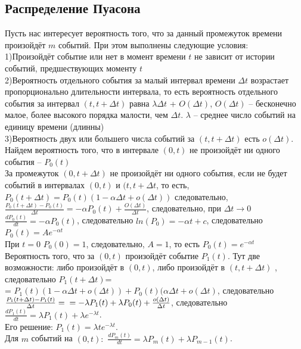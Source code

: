 \documentclass[russian, 12pt, fleqn]{article}
\begin{document}
\subsection{Распределение Пуасона}
\noindent
Пусть нас интересует вероятность того, что за данный промежуток времени произойдёт $m$ событий. При этом выполнены следующие условия:\\
1)Произойдёт событие или нет в момент времени $t$ не зависит от истории событий, предшествующих моменту $t$\\
2)Вероятность отдельного события за малый интервал времени $\Delta t$ возрастает пропорционально длительности интервала, то есть вероятность отдельного события за интервал $(t, t + \Delta t)$ равна $\lambda \Delta t$ + $O(\Delta t)$, $O(\Delta t)$ -- бесконечно малое, более высокого порядка малости, чем $\Delta t$. $\lambda$  -- среднее число событий на единицу времени (длинны)\\
3)Вероятность двух или большего числа событий за $(t, t + \Delta t)$ есть $o(\Delta t)$.\\
Найдем вероятность того, что в интервале $(0, t)$ не произойдёт ни одного события -- $P_0(t)$\\
За промежуток $(0, t + \Delta t)$ не произойдёт ни одного события, если не будет событий в интервалах $(0, t)$ и $(t, t+\Delta t$, то есть,
$P_0(t+\Delta t) = P_0(t)(1-\alpha\Delta t + o(\Delta t))$ следовательно, $\frac{P_0(t+\Delta t) - P_0(t)}{\Delta t} = -\alpha P_0(t) + \frac{O(\Delta t)}{\Delta t}$, следовательно, при $\Delta   t  \rightarrow 0$ $\frac{dP_0(t)}{dt}  = -\alpha P_0(t)$, следовательно $ln(P_0) = -\alpha t + c$, следовательно $P_0(t) = Ae^{-\alpha t}$\\
При $t = 0$ $P_0(0)  = 1$, следовательно, $A = 1$, то есть $P_0(t) = e^{-\alpha t}$\\
Вероятность того, что за $(0, t)$ произойдёт событие $P_1(t)$. 
Тут две возможности: либо произойдёт в $(0, t)$, либо произойдёт в $(t, t + \Delta t)$ , следовательно $P_1(t+\Delta t)$=\\= $P_1(t)(1-\alpha \Delta t + o(\Delta t)) + P_0(t)(\alpha \Delta t + o(\Delta t)$,
 следовательно $\frac{P_1(t+\Delta t) - P_1(t)}{\Delta t} =\\= -\lambda P_1(t) + \lambda P_0(t) + \frac{o(\Delta t)}{\Delta t}$,  следовательно $\frac{dP_1(t)}{dt}  = \lambda P_1(t) + \lambda e^{-\lambda t}$.\\
 Его решение: $P_1(t) = \lambda t e^{-\lambda t}$.\\
Для $m$ событий на $(0, t):$
$\frac{dP_m(t)}{dt} = \lambda P_m(t) + \lambda P_{m-1}(t)$.\\
\end{document}
